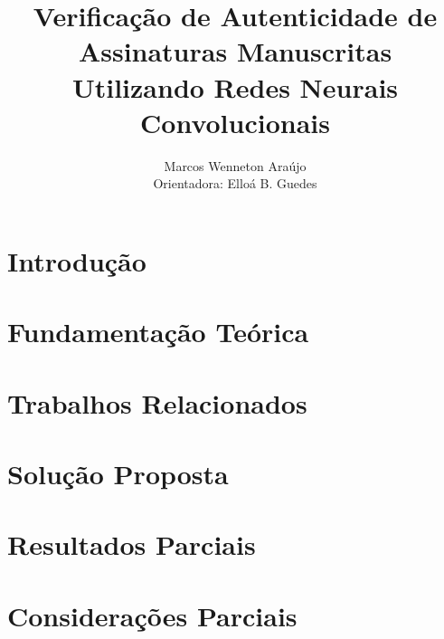 \documentclass[12pt]{article}
\title{Verificação de Autenticidade de Assinaturas Manuscritas\\ Utilizando Redes Neurais Convolucionais}
\author{Marcos Wenneton Araújo\\
Orientadora: Elloá B. Guedes}
\begin{document}
\maketitle
\pagestyle{plain} %

\section{Introdução} \label{sec:introducao}


\section{Fundamentação Teórica} \label{sec:fund-teor}



\section{Trabalhos Relacionados} \label{sec:trab-rel}

\section{Solução Proposta} \label{sec:sol-prop}


\section{Resultados Parciais} \label{sec:res-parc}


\section{Considerações Parciais} \label{sec:cons-parc}






\end{document}
